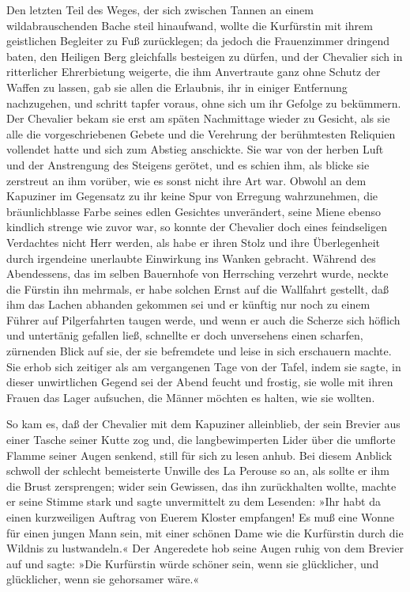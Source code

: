 Den letzten Teil des Weges, der sich zwischen Tannen an einem
wildabrauschenden Bache steil hinaufwand, wollte die Kurfürstin mit
ihrem geistlichen Begleiter zu Fuß zurücklegen; da jedoch die
Frauenzimmer dringend baten, den Heiligen Berg gleichfalls
besteigen zu dürfen, und der Chevalier sich in ritterlicher
Ehrerbietung weigerte, die ihm Anvertraute ganz ohne Schutz der
Waffen zu lassen, gab sie allen die Erlaubnis, ihr in einiger
Entfernung nachzugehen, und schritt tapfer voraus, ohne sich um ihr
Gefolge zu bekümmern. Der Chevalier bekam sie erst am späten
Nachmittage wieder zu Gesicht, als sie alle die vorgeschriebenen
Gebete und die Verehrung der berühmtesten Reliquien vollendet hatte
und sich zum Abstieg anschickte. Sie war von der herben Luft und
der Anstrengung des Steigens gerötet, und es schien ihm, als blicke
sie zerstreut an ihm vorüber, wie es sonst nicht ihre Art war.
Obwohl an dem Kapuziner im Gegensatz zu ihr keine Spur von Erregung
wahrzunehmen, die bräunlichblasse Farbe seines edlen Gesichtes
unverändert, seine Miene ebenso kindlich strenge wie zuvor war, so
konnte der Chevalier doch eines\pagenum{[111]} feindseligen
Verdachtes nicht Herr werden, als habe er ihren Stolz und ihre
Überlegenheit durch irgendeine unerlaubte Einwirkung ins Wanken
gebracht. Während des Abendessens, das im selben Bauernhofe von
Herrsching verzehrt wurde, neckte die Fürstin ihn mehrmals, er habe
solchen Ernst auf die Wallfahrt gestellt, daß ihm das Lachen
abhanden gekommen sei und er künftig nur noch zu einem Führer auf
Pilgerfahrten taugen werde, und wenn er auch die Scherze sich
höflich und untertänig gefallen ließ, schnellte er doch unversehens
einen scharfen, zürnenden Blick auf sie, der sie befremdete und
leise in sich erschauern machte. Sie erhob sich zeitiger als am
vergangenen Tage von der Tafel, indem sie sagte, in dieser
unwirtlichen Gegend sei der Abend feucht und frostig, sie wolle mit
ihren Frauen das Lager aufsuchen, die Männer möchten es halten, wie
sie wollten.

So kam es, daß der Chevalier mit dem Kapuziner alleinblieb, der
sein Brevier aus einer Tasche seiner Kutte zog und, die
langbewimperten Lider über die umflorte Flamme seiner Augen
senkend, still für sich zu lesen anhub. Bei diesem Anblick schwoll
der schlecht bemeisterte Unwille des La Perouse so an, als sollte
er ihm die Brust zersprengen; wider sein Gewissen, das ihn
zurückhalten wollte, machte er seine Stimme stark und sagte
unvermittelt zu dem Lesenden: »Ihr habt da einen kurzweiligen
Auftrag von Euerem Kloster empfangen! Es muß eine Wonne für einen
jungen Mann sein, mit einer schönen Dame wie die Kurfürstin durch
die Wildnis zu lustwandeln.« Der Angeredete hob seine Augen ruhig
von dem Brevier auf und sagte: »Die Kurfürstin würde schöner sein,
wenn sie glücklicher, und glücklicher, wenn sie gehorsamer wäre.«

